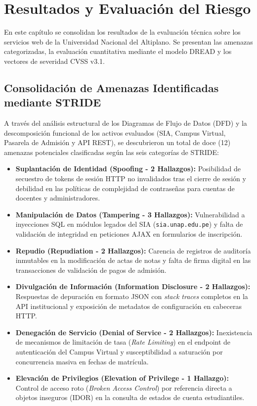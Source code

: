 \chapter{Resultados y Evaluación del Riesgo}
\label{ch:resultados}

En este capítulo se consolidan los resultados de la evaluación técnica sobre los servicios web de la Universidad Nacional del Altiplano. Se presentan las amenazas categorizadas, la evaluación cuantitativa mediante el modelo DREAD y los vectores de severidad CVSS v3.1.

\section{Consolidación de Amenazas Identificadas mediante STRIDE}
A través del análisis estructural de los Diagramas de Flujo de Datos (DFD) y la descomposición funcional de los activos evaluados (SIA, Campus Virtual, Pasarela de Admisión y API REST), se descubrieron un total de doce (12) amenazas potenciales clasificadas según las seis categorías de STRIDE:

\begin{itemize}
    \item \textbf{Suplantación de Identidad (Spoofing - 2 Hallazgos):} Posibilidad de secuestro de tokens de sesión HTTP no invalidados tras el cierre de sesión y debilidad en las políticas de complejidad de contraseñas para cuentas de docentes y administradores.
    \item \textbf{Manipulación de Datos (Tampering - 3 Hallazgos):} Vulnerabilidad a inyecciones SQL en módulos legados del SIA (\texttt{sia.unap.edu.pe}) y falta de validación de integridad en peticiones AJAX en formularios de inscripción.
    \item \textbf{Repudio (Repudiation - 2 Hallazgos):} Carencia de registros de auditoría inmutables en la modificación de actas de notas y falta de firma digital en las transacciones de validación de pagos de admisión.
    \item \textbf{Divulgación de Información (Information Disclosure - 2 Hallazgos):} Respuestas de depuración en formato JSON con \textit{stack traces} completos en la API institucional y exposición de metadatos de configuración en cabeceras HTTP.
    \item \textbf{Denegación de Servicio (Denial of Service - 2 Hallazgos):} Inexistencia de mecanismos de limitación de tasa (\textit{Rate Limiting}) en el endpoint de autenticación del Campus Virtual y susceptibilidad a saturación por concurrencia masiva en fechas de matrícula.
    \item \textbf{Elevación de Privilegios (Elevation of Privilege - 1 Hallazgo):} Control de acceso roto (\textit{Broken Access Control}) por referencia directa a objetos inseguros (IDOR) en la consulta de estados de cuenta estudiantiles.
\end{itemize}

